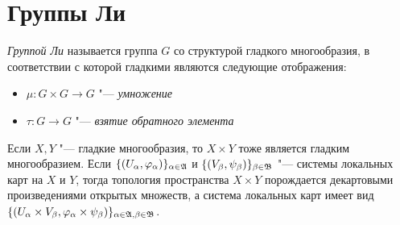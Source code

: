 \section{Группы Ли}

\begin{definition}
	\textit{Группой Ли} называется группа $G$ со структурой гладкого многообразия, в соответствии с которой гладкими являются следующие отображения:
	\begin{itemize}
		\item $\mu: G \times G \to G$ "--- \textit{умножение}
		\item $\tau: G \to G$ "--- \textit{взятие обратного элемента}
	\end{itemize}
\end{definition}

\begin{note}
	Если $X, Y$ "--- гладкие многообразия, то $X \times Y$ тоже является гладким многообразием. Если $\{(U_\alpha, \varphi_\alpha)\}_{\alpha \in \mathfrak A}$ и $\{(V_\beta, \psi_\beta)\}_{\beta \in \mathfrak B}$ "--- системы локальных карт на $X$ и $Y$, тогда топология пространства $X \times Y$ порождается декартовыми произведениями открытых множеств, а система локальных карт имеет вид $\{(U_\alpha \times V_\beta, \varphi_\alpha \times \psi_\beta)\}_{\alpha \in \mathfrak A, \beta \in \mathfrak B}$.
\end{note}

